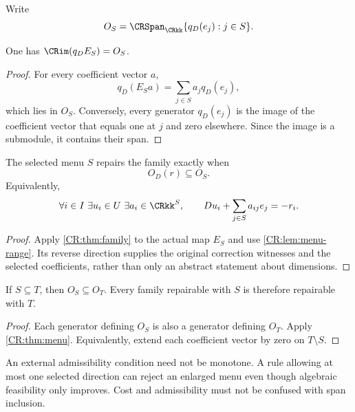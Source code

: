 Write
\[
O_S=\CRSpan_{\CRkk}\{q_D(e_j):j\in S\}.
\]

\begin{CRlemma}\label{CR:lem:menu-range}
One has $\CRim(q_DE_S)=O_S$.
\end{CRlemma}
\begin{proof}
For every coefficient vector $a$,
\[
q_D(E_Sa)=\sum_{j\in S}a_jq_D(e_j),
\]
which lies in $O_S$. Conversely, every generator $q_D(e_j)$ is the image of the coefficient vector that equals one at $j$ and zero elsewhere. Since the image is a submodule, it contains their span.
\end{proof}

\begin{CRtheorem}\label{CR:thm:menu}
The selected menu $S$ repairs the family exactly when
\begin{equation}\label{CR:eq:menu-criterion}
O_D(r)\subseteq O_S.
\end{equation}
Equivalently,
\[
\forall i\in I\ \exists u_i\in U\ \exists a_i\in\CRkk^S,
\qquad Du_i+\sum_{j\in S}a_{ij}e_j=-r_i.
\]
\end{CRtheorem}
\begin{proof}
Apply \cref{CR:thm:family} to the actual map $E_S$ and use \cref{CR:lem:menu-range}. Its reverse direction supplies the original correction witnesses and the selected coefficients, rather than only an abstract statement about dimensions.
\end{proof}

\begin{CRproposition}\label{CR:prop:menu-mono}
If $S\subseteq T$, then $O_S\subseteq O_T$. Every family repairable with $S$ is therefore repairable with $T$.
\end{CRproposition}
\begin{proof}
Each generator defining $O_S$ is also a generator defining $O_T$. Apply \cref{CR:thm:menu}. Equivalently, extend each coefficient vector by zero on $T\setminus S$.
\end{proof}

An external admissibility condition need not be monotone. A rule allowing at most one selected direction can reject an enlarged menu even though algebraic feasibility only improves. Cost and admissibility must not be confused with span inclusion.

